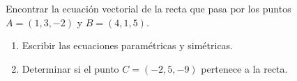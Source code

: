 Encontrar la ecuación vectorial de la recta que pasa por los puntos $A = (1, 3, -2)$ y $B = (4, 1, 5)$.
\begin{enumerate}
    \item Escribir las ecuaciones paramétricas y simétricas.
    \item Determinar si el punto $C = (-2, 5, -9)$ pertenece a la recta.
\end{enumerate}